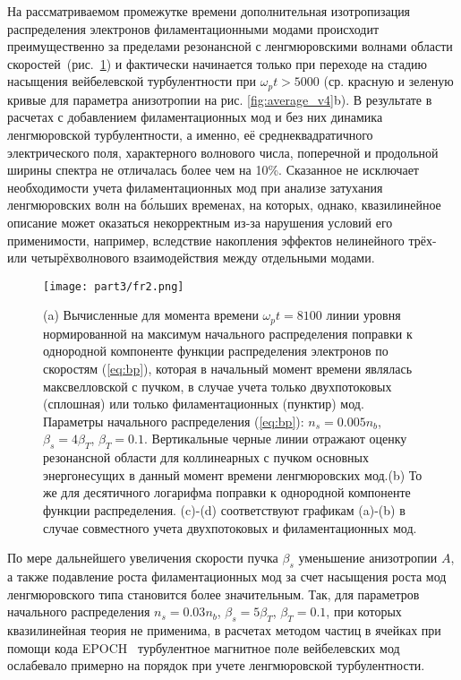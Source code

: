 На рассматриваемом промежутке времени дополнительная изотропизация распределения электронов филаментационными модами происходит преимущественно за пределами резонансной с ленгмюровскими волнами области скоростей~(рис.~\ref{fig:fr2}) и фактически начинается только при переходе на стадию насыщения вейбелевской турбулентности при $\omega_p  t > 5000$ (ср. красную и зеленую кривые для параметра анизотропии на рис. \ref{fig:average_v4}b). В результате в расчетах с добавлением филаментационных мод и без них динамика ленгмюровской турбулентности, а именно, её среднеквадратичного электрического поля, характерного волнового числа, поперечной и продольной ширины спектра не отличалась более чем на 10\%. Сказанное не исключает необходимости учета филаментационных мод при анализе затухания ленгмюровских волн на б\'{о}льших временах, на которых, однако, квазилинейное описание может оказаться некорректным из-за нарушения условий его применимости, например, вследствие накопления эффектов нелинейного трёх- или четырёхволнового взаимодействия между отдельными модами.


\begin{figure}[h]
\texttt{[image: part3/fr2.png]}
\centering
{}
\caption{(a) Вычисленные для момента времени $\omega_pt=8100$ линии уровня нормированной на максимум начального распределения поправки к однородной компоненте функции распределения электронов по скоростям (\ref{eq:bp}), которая в начальный момент времени являлась максвелловской с пучком, в случае учета только двухпотоковых (сплошная) или только филаментационных (пунктир) мод. Параметры начального распределения (\ref{eq:bp}): $n_s=0.005n_b$, $\beta_s=4\beta_T$, $\beta_T=0.1$. Вертикальные черные линии отражают оценку резонансной области для коллинеарных с пучком основных энергонесущих в данный момент времени ленгмюровских мод.(b) То же для десятичного логарифма поправки к однородной компоненте функции распределения. 
(c)-(d) соответствуют графикам (a)-(b) в случае совместного учета двухпотоковых и филаментационных мод.}
\label{fig:fr2}
\end{figure}

По мере дальнейшего увеличения скорости пучка $\beta_s$ уменьшение анизотропии $A$, а также подавление роста филаментационных мод за счет насыщения роста мод ленгмюровского типа становится более значительным. Так, для параметров начального распределения $n_s=0.03n_b$, $\beta_s=5\beta_T$, $\beta_T=0.1$, при которых квазилинейная теория не применима, в расчетах методом частиц в ячейках при помощи кода EPOCH~\cite{Arber2015} турбулентное магнитное поле вейбелевских мод ослабевало примерно на порядок при учете ленгмюровской турбулентности.


